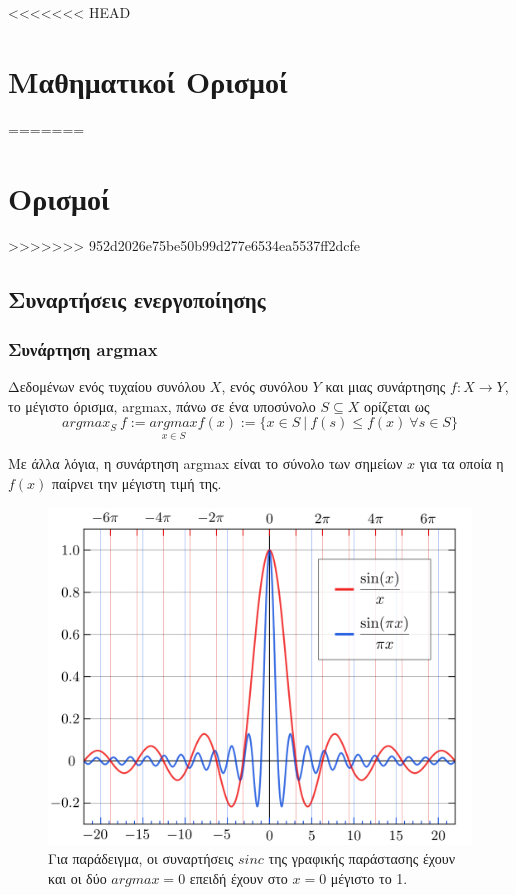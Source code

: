 <<<<<<< HEAD
\section{Μαθηματικοί Ορισμοί}
=======
\section*{Ορισμοί}
>>>>>>> 952d2026e75be50b99d277e6534ea5537ff2dcfe
\newtheorem{definition}{Ορισμός}
\label{appendix:math_definitions}

\subsection{Συναρτήσεις ενεργοποίησης}
\subsubsection{Συνάρτηση argmax}
\label{definition:argmax}
Δεδομένων ενός τυχαίου συνόλου \(X\), ενός συνόλου \(Y\) και μιας συνάρτησης \(f: X\rightarrow Y\), το μέγιστο όρισμα, argmax, πάνω σε ένα υποσύνολο \(S \subseteq X\) ορίζεται ως
\[argmax_{S} \: f := \underset{x \in S}{argmax} f(x) := \{x \in S \: | \: f(s) \leq f(x)  \: \forall s \in S\} \]


Με άλλα λόγια, η συνάρτηση argmax είναι το σύνολο των σημείων \(x\) για τα οποία η \(f(x)\) παίρνει την μέγιστη τιμή της.

\begin{figure}[h]
	\centering
	\includegraphics[scale=0.2]{images/appendix/function_argmax_example.png}
	\caption[Παράδειγμα συνάρτησης argmax]{Για παράδειγμα, οι συναρτήσεις \(sinc\) της γραφικής παράστασης έχουν και οι δύο \(argmax = 0\) επειδή έχουν στο \(x = 0\) μέγιστο το 1. }
\end{figure}


